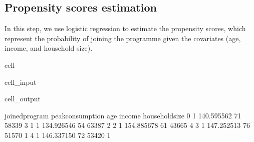 \documentclass[letterpaper,10pt,english]{jupyterBook}
\begin{document}
\subsection{Propensity scores estimation}
\label{\detokenize{notebooks/propensity_scores:propensity-scores-estimation}}
\sphinxAtStartPar
In this step, we use logistic regression to estimate the propensity scores, which represent the probability of joining the programme given the covariates (age, income, and household size).

\begin{sphinxuseclass}{cell}\begin{sphinxVerbatimInput}

\begin{sphinxuseclass}{cell_input}
\begin{sphinxVerbatim}[commandchars=\\\{\}]
  \PYG{p}{[}  \PYG{p}{]}
  \PYG{p}{[}\PYG{p}{]}
  \PYG{p}{[}\PYG{p}{]}

  
 
\PYG{p}{[}\PYG{p}{]}  \PYG{p}{[} \PYG{p}{]}

\end{sphinxVerbatim}

\end{sphinxuseclass}\end{sphinxVerbatimInput}
\begin{sphinxVerbatimOutput}

\begin{sphinxuseclass}{cell_output}
\begin{sphinxVerbatim}[commandchars=\\\{\}]
   joined\PYGZus{}program  peak\PYGZus{}consumption  age  income  household\PYGZus{}size  \PYGZbs{}
0               1        140.595562   71   58339               3   
1               1        134.926546   54   63387               2   
2               1        154.885678   61   43665               4   
3               1        147.252513   76   51570               1   
4               1        146.337150   72   53420               1   


\end{sphinxVerbatim}
\end{sphinxuseclass}
\end{sphinxVerbatimOutput}
\end{sphinxuseclass}
\end{document}
